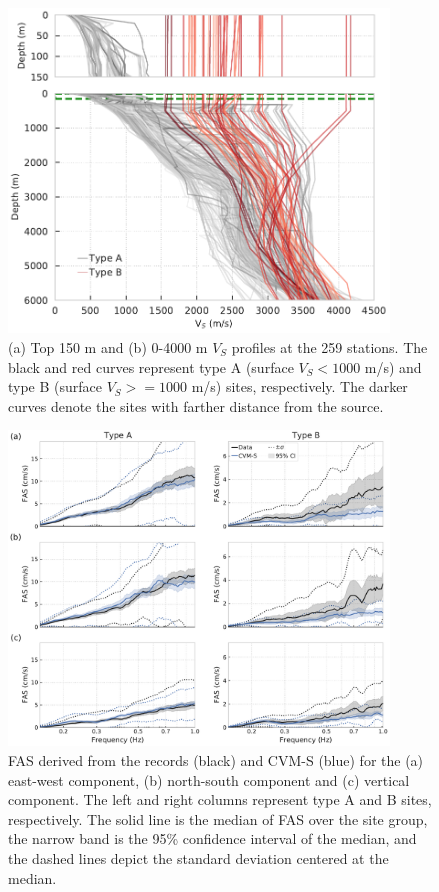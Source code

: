 \clearpage
\begin{figure}[!ht]
  \centering
  \includegraphics[width=0.9\textwidth]{figures/figure_vs30_3.pdf}
  \caption{(a) Top 150 m and (b) 0-4000 m $V_S$ profiles at the 259 stations. The black and red curves represent type A (surface $V_S < 1000$ m/s) and type B (surface $V_S >= 1000$ m/s) sites, respectively. The darker curves denote the sites with farther distance from the source.}
  \label{fig:vs30-3}
\end{figure}

\clearpage
\begin{figure}[!ht]
  \centering
  \includegraphics[width=0.9\textwidth]{figures/figure_vs30_4.pdf}
  \caption{FAS derived from the records (black) and CVM-S (blue) for the (a) east-west component, (b) north-south component and (c) vertical component. The left and right columns represent type A and B sites, respectively. The solid line is the median of FAS over the site group, the narrow band is the 95\% confidence interval of the median, and the dashed lines depict the standard deviation centered at the median.
  }
  \label{fig:vs30-4}
\end{figure}

